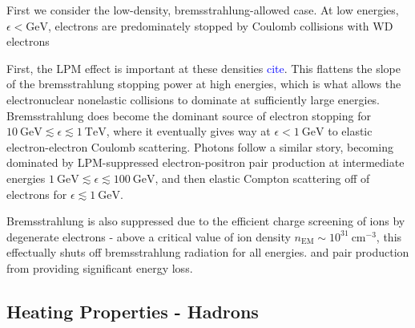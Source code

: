 \documentclass[twocolumn,showpacs,preprintnumbers,amsmath,amssymb,prd]{revtex4}
\newcommand{\TeV}{\text{TeV}}
\newcommand{\GeV}{\text{GeV}}
\begin{document}
First we consider the low-density, bremsstrahlung-allowed case.  
At low energies, $\epsilon < \GeV$, electrons are predominately stopped by Coulomb collisions with WD electrons 

First, the LPM effect is important at these densities \textcolor{blue}{cite}.
This flattens the slope of the bremsstrahlung stopping power at high energies, which is what allows the electronuclear nonelastic collisions to dominate at sufficiently large energies.
Bremsstrahlung does become the dominant source of electron stopping for $10~\GeV \lesssim \epsilon \lesssim 1~\TeV$, where it eventually gives way at $\epsilon < 1~\GeV$ to elastic electron-electron Coulomb scattering. 
Photons follow a similar story, becoming dominated by LPM-suppressed electron-positron pair production at intermediate energies $1~\GeV \lesssim \epsilon \lesssim 100~\GeV$, and then elastic Compton scattering off of electrons for $\epsilon \lesssim 1~\GeV$. 

Bremsstrahlung is also suppressed due to the efficient charge screening of ions by degenerate electrons - above a critical value of ion density $n_\text{EM} \sim 10^{31} ~\text{cm}^{-3}$, this effectually shuts off bremsstrahlung radiation for all energies.  and pair production from providing significant energy loss. 



\subsection{Heating Properties - Hadrons}
\end{document}
